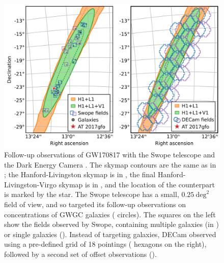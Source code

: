 \begin{colsection}
\begin{figure}[p]
    \begin{center}
        \includegraphics[width=\linewidth]{images/170817_obs.pdf}
    \end{center}
    \caption[Follow-up observations of GW170817 with Swope and DECam]{
        Follow-up observations of GW170817 with the Swope telescope \citep[left, adapted from][]{GW170817_Swope} and the Dark Energy Camera \citep[right, adapted from][]{GW170817_DECam}. The skymap contours are the same as in ; the Hanford-Livingston skymap is in , the final Hanford-Livingston-Virgo skymap is in , and the location of the counterpart is marked by the  star. The Swope telescope has a small, $0.25~\text{deg}^2$ field of view, and so targeted its follow-up observations on concentrations of GWGC galaxies ( circles). The squares on the left show the fields observed by Swope, containing multiple galaxies (in ) or single galaxies (). Instead of targeting galaxies, DECam observed using a pre-defined grid of 18 pointings ( hexagons on the right), followed by a second set of offset observations ().
        }\label{fig:swope_decam}
\end{figure}


\end{colsection}
